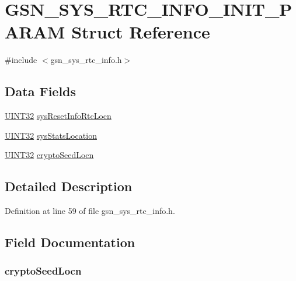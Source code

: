 \hypertarget{a00259}{
\section{GSN\_\-SYS\_\-RTC\_\-INFO\_\-INIT\_\-PARAM Struct Reference}
\label{a00259}
}


{\ttfamily \#include $<$gsn\_\-sys\_\-rtc\_\-info.h$>$}

\subsection*{Data Fields}
\begin{DoxyCompactItemize}
\item 
\hyperlink{a00660_gae1e6edbbc26d6fbc71a90190d0266018}{UINT32} \hyperlink{a00259_abcb215deb500d73ccf5760cab85861fc}{sysResetInfoRtcLocn}
\item 
\hyperlink{a00660_gae1e6edbbc26d6fbc71a90190d0266018}{UINT32} \hyperlink{a00259_aea6f9efcd46664e1ebcf3f9fa915de69}{sysStatsLocation}
\item 
\hyperlink{a00660_gae1e6edbbc26d6fbc71a90190d0266018}{UINT32} \hyperlink{a00259_a9ad02aaef6e1e772e96c824033ba84c4}{cryptoSeedLocn}
\end{DoxyCompactItemize}


\subsection{Detailed Description}


Definition at line 59 of file gsn\_\-sys\_\-rtc\_\-info.h.



\subsection{Field Documentation}
\hypertarget{a00259_a9ad02aaef6e1e772e96c824033ba84c4}{
\subsubsection[{cryptoSeedLocn}]{ {\bf cryptoSeedLocn}}}
\label{a00259_a9ad02aaef6e1e772e96c824033ba84c4}


